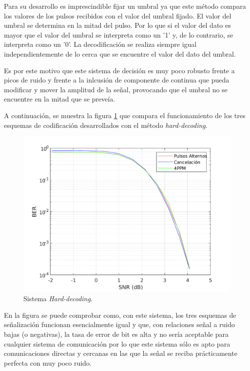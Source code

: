 Para su desarrollo es imprescindible fijar un umbral ya que este método compara los 
valores de los pulsos recibidos con el valor del umbral fijado. El valor del umbral se 
determina en la mitad del pulso. Por lo que si el valor del dato es mayor que el valor 
del umbral se interpreta como un '1' y, de lo contrario, se interpreta como un '0'.
La decodificación se realiza siempre igual independientemente de lo cerca que se encuentre 
el valor del dato del umbral.

Es por este motivo que este sistema de decisión es muy poco robusto frente a picos de 
ruido y frente a la inlcusión de componente de continua que pueda modificar y mover 
la amplitud de la señal, provocando que el umbral no se encuentre en la mitad que 
se preveía.

A continuación, se muestra la figura \ref{hard-decoding} que compara el funcionamiento de 
los tres esquemas de codificación desarrollados con el método \textit{hard-decoding}.

\begin{figure}[ht]
    \centering
    \includegraphics[scale=0.65]{./figuras/Hard.pdf}
    \caption{\small{Sistema \textit{Hard-decoding}.}}
    \label{hard-decoding}%
\end{figure}

En la figura se puede comprobar como, con este sistema, los tres esquemas de señalización 
funcionan esencialmente igual y que, con relaciones señal a ruido bajas (o negativas), la 
tasa de error de bit es alta y no sería aceptable para cualquier sistema de comunicación
por lo que este sistema sólo es apto para comunicaciones directas y cercanas en las que 
la señal se reciba prácticamente perfecta con muy poco ruido.

